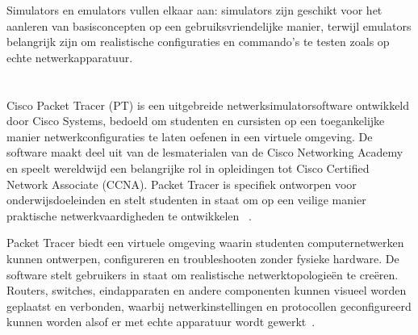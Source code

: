 Simulators en emulators vullen elkaar aan: simulators zijn geschikt voor het aanleren van basisconcepten op een gebruiksvriendelijke manier, terwijl emulators belangrijk zijn om realistische configuraties en commando’s te testen zoals op echte netwerkapparatuur.


\section{}
\label{sec:Cisco Packet Tracer}

Cisco Packet Tracer (PT) is een uitgebreide netwerksimulatorsoftware ontwikkeld door Cisco Systems, bedoeld om studenten en cursisten op een toegankelijke manier netwerkconfiguraties te laten oefenen in een virtuele omgeving. De software maakt deel uit van de lesmaterialen van de Cisco Networking Academy en speelt wereldwijd een belangrijke rol in opleidingen tot Cisco Certified Network Associate (CCNA). Packet Tracer is specifiek ontworpen voor onderwijsdoeleinden en stelt studenten in staat om op een veilige manier praktische netwerkvaardigheden te ontwikkelen ~\autocite{netacad2025}.



\vspace{0.3cm}



Packet Tracer biedt een virtuele omgeving waarin studenten computernetwerken kunnen ontwerpen, configureren en troubleshooten zonder fysieke hardware. De software stelt gebruikers in staat om realistische netwerktopologieën te creëren. Routers, switches, eindapparaten en andere componenten kunnen visueel worden geplaatst en verbonden, waarbij netwerkinstellingen en protocollen geconfigureerd kunnen worden alsof er met echte apparatuur wordt gewerkt~\autocite{netacad2025}.



\vspace{0.5cm}

\vspace{0.5cm}

\vspace{0.5cm}



\subsection{}%
\label{sec:Functionaliteiten}

